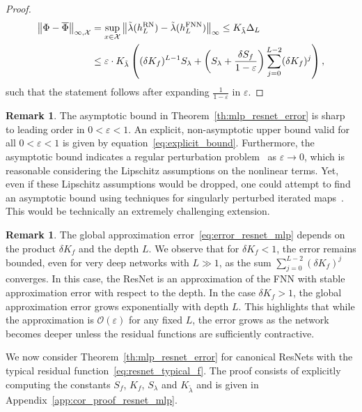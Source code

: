 \documentclass[10pt]{article}
\theoremstyle{definition}
\newtheorem{remark}[theorem]{Remark}
\numberwithin{equation}{section}
\newcommand{\eps}{\varepsilon}
\newcommand\norm[1]{\left\lVert#1\right\rVert}
\begin{document}
\begin{proof}
    \begin{align}
        \norm{\Phi - \overline{\Phi}}_{\infty,\mathcal{X}} &= \sup_{x \in \mathcal{X}}\norm{\tilde{\lambda}(h_L^{\textup{RN}}) - \tilde{\lambda}(h_L^{\textup{FNN}})}_\infty 
        \leq K_{\tilde{\lambda}} \Delta_L \nonumber \\
        &\leq \eps \cdot K_{\tilde{\lambda}}\left( (\delta K_f)^{L-1} S_\lambda +  \left(S_\lambda  + \frac{\delta S_f}{1-\eps}\right) \sum_{j = 0}^{L-2} (\delta K_f)^j\right),  \label{eq:explicit_bound} 
    \end{align}
    such that the statement follows after expanding $\frac{1}{1-\eps}$ in $\eps$.
\end{proof}

\begin{remark} \label{rem:scaling_linear}
    The asymptotic bound in Theorem~\ref{th:mlp_resnet_error} is sharp to leading order in $0<\eps<1$. An explicit, non-asymptotic upper bound valid for all $0<\eps<1$ is given by equation~\eqref{eq:explicit_bound}. Furthermore, the asymptotic bound indicates a regular perturbation problem~\cite{KuehnBook} as $\varepsilon\rightarrow 0$, which is reasonable considering the Lipschitz assumptions on the nonlinear terms. Yet, even if these Lipschitz assumptions would be dropped, one could attempt to find an asymptotic bound using techniques for singularly perturbed iterated maps~\cite{JelbartKuehn}. This would be technically an extremely challenging extension. 
\end{remark}

\begin{remark}
    The global approximation error~\eqref{eq:error_resnet_mlp} depends on the product $\delta K_f$ and the depth $L$. We observe that for $\delta K_f < 1$, the error remains bounded, even for very deep networks with $L \gg 1$, as the sum $\sum_{j=0}^{L-2} (\delta K_f)^j$ converges. In this case, the ResNet is an approximation of the FNN with stable approximation error with respect to the depth. In the case $\delta K_f > 1$, the global approximation error grows exponentially with depth $L$.  This highlights that while the approximation is $\mathcal{O}(\eps)$ for any fixed $L$, the error grows as the network becomes deeper unless the residual functions are sufficiently contractive.
\end{remark}

We now consider Theorem~\ref{th:mlp_resnet_error} for canonical ResNets with the typical residual function~\eqref{eq:resnet_typical_f}. The proof consists of explicitly computing the constants $S_f$, $K_f$, $S_{\lambda}$ and $K_{\tilde{\lambda}}$ and is given in Appendix~\ref{app:cor_proof_resnet_mlp}.
\end{document}
